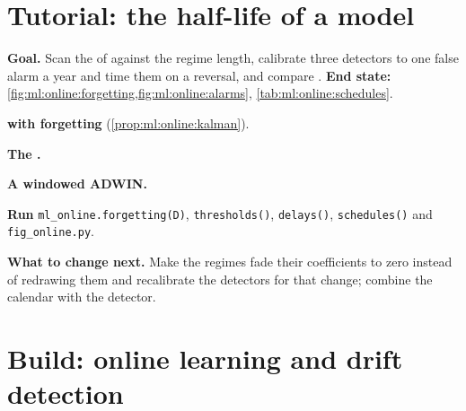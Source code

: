 \section{Tutorial: the half-life of a model}\label{tut:ml:online-learning-and-drift:tut}

\begin{tutorial}
\textbf{Goal.} Scan the  of  against the regime length, calibrate three detectors
to one false alarm a year and time them on a reversal, and compare . \textbf{End state:}
\cref{fig:ml:online:forgetting,fig:ml:online:alarms}, \cref{tab:ml:online:schedules}.
\begin{tutsteps}
\item \textbf{ with forgetting} (\cref{prop:ml:online:kalman}).
\label{lst:ml:online:rls}
\item \textbf{The .}
\label{lst:ml:online:ph}
\item \textbf{A windowed ADWIN.}
\label{lst:ml:online:adwin}
\item \textbf{Run} \texttt{ml\_online.forgetting(D)}, \texttt{thresholds()}, \texttt{delays()}, \texttt{schedules()} and
\texttt{fig\_online.py}.
\end{tutsteps}
\textbf{What to change next.} Make the regimes fade their coefficients to zero instead of redrawing them and recalibrate the
detectors for that change; combine the calendar with the detector.
\end{tutorial}

\section{Build: online learning and drift detection}\label{bld:ml:online-learning-and-drift:onlinelearn}

